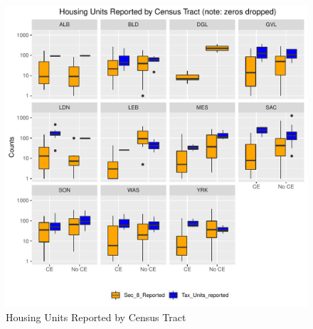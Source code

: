 \documentclass{article}\usepackage[]{graphicx}\usepackage[]{color}
\makeatletter
\def\maxwidth{ %
  \ifdim\Gin@nat@width>\linewidth
    \linewidth
  \else
    \Gin@nat@width
  \fi
}
\newenvironment{knitrout}{}{} %
\makeatother
\begin{document}
\begin{knitrout}
\color{fgcolor}\begin{figure}
\includegraphics[width=\maxwidth]{figure/BoxPlot_All_Units-1} \caption[Housing Units Reported by Census Tract]{Housing Units Reported by Census Tract}\label{fig:BoxPlot_All_Units}
\end{figure}


\end{knitrout}
\end{document}
